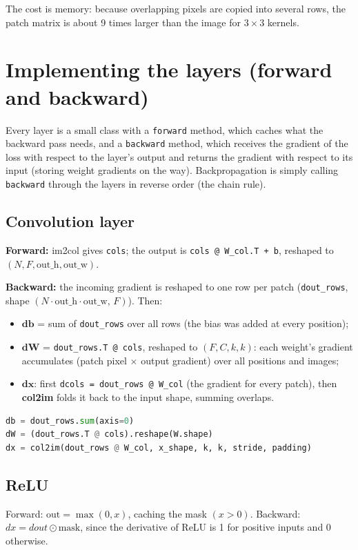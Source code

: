 \documentclass[11pt,a4paper]{article}
\newcommand{\code}[1]{\texttt{#1}}
\begin{document}
The cost is memory: because overlapping pixels are copied into several rows, the patch matrix is about 9 times larger than the image for $3{\times}3$ kernels.
\section{Implementing the layers (forward and backward)}
Every layer is a small class with a \code{forward} method, which caches what the backward pass needs, and a \code{backward} method, which receives the gradient of the loss with respect to the layer's output and returns the gradient with respect to its input (storing weight gradients on the way). Backpropagation is simply calling \code{backward} through the layers in reverse order (the chain rule).

\subsection{Convolution layer}
\textbf{Forward:} im2col gives \code{cols}; the output is \code{cols @ W\_col.T + b}, reshaped to $(N,F,\text{out\_h},\text{out\_w})$.

\textbf{Backward:} the incoming gradient is reshaped to one row per patch (\code{dout\_rows}, shape $(N\cdot\text{out\_h}\cdot\text{out\_w},\,F)$). Then:
\begin{itemize}
  \item $\mathbf{db}$ = sum of \code{dout\_rows} over all rows (the bias was added at every position);
  \item $\mathbf{dW}$ = \code{dout\_rows.T @ cols}, reshaped to $(F,C,k,k)$: each weight's gradient accumulates (patch pixel $\times$ output gradient) over all positions and images;
  \item $\mathbf{dx}$: first \code{dcols = dout\_rows @ W\_col} (the gradient for every patch), then \textbf{col2im} folds it back to the input shape, summing overlaps.
\end{itemize}
\begin{lstlisting}[language=Python]
db = dout_rows.sum(axis=0)
dW = (dout_rows.T @ cols).reshape(W.shape)
dx = col2im(dout_rows @ W_col, x_shape, k, k, stride, padding)
\end{lstlisting}

\subsection{ReLU}
Forward: $\text{out}=\max(0,x)$, caching the mask $(x>0)$. Backward: $dx = dout \odot \text{mask}$, since the derivative of ReLU is 1 for positive inputs and 0 otherwise.
\end{document}
